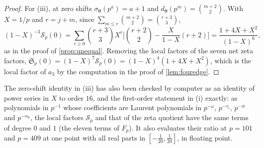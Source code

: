 \documentclass[11pt,colorlinks]{charlie}
\begin{document}
\begin{proof}
For (iii), at zero shifts $\sigma_{\boldsymbol 0}(p^a)=a+1$ and $d_{\boldsymbol 0}(p^m)=\binom{m+2}2$. With $X=1/p$ and $r=j+m$, since $\sum_{m\le r}\binom{m+2}2=\binom{r+3}3$,
\[
 (1-X)^{-3}\mathcal S_p(0)=\sum_{r\ge0}\binom{r+3}3X^r\Big[\binom{r+2}2-\frac X{1-X}(r+2)\Big]=\frac{1+4X+X^2}{(1-X)^6},
\]
as in the proof of \cref{prop:unequal}. Removing the local factors of the seven net zeta factors, $\mathfrak S_p(0)=(1-X)^7\mathcal S_p(0)=(1-X)^4(1+4X+X^2)$, which is the local factor of $a_3$ by the computation in the proof of \cref{lem:fouredge}.
\end{proof}
\noindent The zero-shift identity in (iii) has also been checked by computer as an identity of power series in $X$ to order $16$, and the first-order statement in (i) exactly: as polynomials in $p^{-1}$ whose coefficients are Laurent polynomials in $p^{-\omega}$, $p^{-v_i}$, $p^{-w}$ and $p^{-\alpha_k}$, the local factors $\mathcal S_p$ and that of the zeta quotient have the same terms of degree $0$ and $1$ (the eleven terms of $F_p$). It also evaluates their ratio at $p=101$ and $p=409$ at one point with all real parts in $[-\frac1{20},\frac1{20}]$, in floating point.
\end{document}
